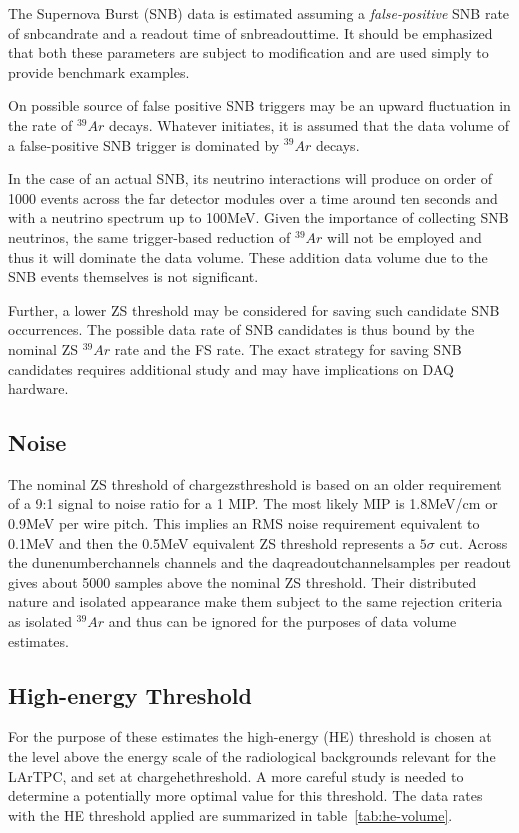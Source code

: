 The Supernova Burst (SNB) data is estimated assuming a
\textit{false-positive} SNB rate of snbcandrate and a readout time of
snbreadouttime.
It should be emphasized that both these parameters are subject to
modification and are used simply to provide benchmark examples.

On possible source of false positive SNB triggers may be an upward
fluctuation in the rate of $^{39}Ar$ decays.
Whatever initiates, it is assumed that the data volume of a
false-positive SNB trigger is dominated by $^{39}Ar$ decays.

In the case of an actual SNB, its neutrino interactions will produce
on order of 1000 events across the far detector modules over a time
around ten seconds and with a neutrino spectrum up to 100MeV.
Given the importance of collecting SNB neutrinos, the same
trigger-based reduction of $^{39}Ar$ will not be employed and thus it
will dominate the data volume.
These addition data volume due to the SNB events themselves is not
significant.

Further, a lower ZS threshold may be considered for saving such
candidate SNB occurrences.
The possible data rate of SNB candidates is thus bound by the nominal
ZS $^{39}Ar$ rate and the FS rate.
The exact strategy for saving SNB candidates requires additional study
and may have implications on DAQ hardware.

\subsection{Noise}

The nominal ZS threshold of chargezsthreshold is based on an older
requirement of a 9:1 signal to noise ratio for a 1 MIP.
The most likely MIP is 1.8MeV/cm or 0.9MeV per wire pitch.
This implies an RMS noise requirement equivalent to 0.1MeV and
then the 0.5MeV equivalent ZS threshold represents a $5\sigma$ cut.
Across the dunenumberchannels channels and the
daqreadoutchannelsamples per readout gives about 5000 samples
above the nominal ZS threshold.
Their distributed nature and isolated appearance make them subject to
the same rejection criteria as isolated $^{39}Ar$ and thus can be
ignored for the purposes of data volume estimates.


\subsection{High-energy Threshold}

For the purpose of these estimates the  high-energy (HE) threshold is chosen at the level above 
the energy scale of the radiological backgrounds relevant for the LArTPC, and set at  chargehethreshold.
A more careful study is needed to determine a potentially more optimal value for this threshold.
The data rates with the HE threshold applied are summarized in table~\ref{tab:he-volume}.

